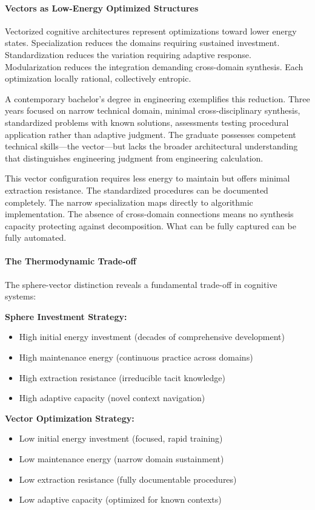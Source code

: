 \paragraph{Vectors as Low-Energy Optimized Structures}

Vectorized cognitive architectures represent optimizations toward lower energy states. Specialization reduces the domains requiring sustained investment. Standardization reduces the variation requiring adaptive response. Modularization reduces the integration demanding cross-domain synthesis. Each optimization locally rational, collectively entropic.

A contemporary bachelor's degree in engineering exemplifies this reduction. Three years focused on narrow technical domain, minimal cross-disciplinary synthesis, standardized problems with known solutions, assessments testing procedural application rather than adaptive judgment. The graduate possesses competent technical skills—the vector—but lacks the broader architectural understanding that distinguishes engineering judgment from engineering calculation.

This vector configuration requires less energy to maintain but offers minimal extraction resistance. The standardized procedures can be documented completely. The narrow specialization maps directly to algorithmic implementation. The absence of cross-domain connections means no synthesis capacity protecting against decomposition. What can be fully captured can be fully automated.

\paragraph{The Thermodynamic Trade-off}

The sphere-vector distinction reveals a fundamental trade-off in cognitive systems:

\textbf{Sphere Investment Strategy:}
\begin{itemize}
\item High initial energy investment (decades of comprehensive development)
\item High maintenance energy (continuous practice across domains)
\item High extraction resistance (irreducible tacit knowledge)
\item High adaptive capacity (novel context navigation)
\end{itemize}

\textbf{Vector Optimization Strategy:}
\begin{itemize}
\item Low initial energy investment (focused, rapid training)
\item Low maintenance energy (narrow domain sustainment)
\item Low extraction resistance (fully documentable procedures)
\item Low adaptive capacity (optimized for known contexts)
\end{itemize}


